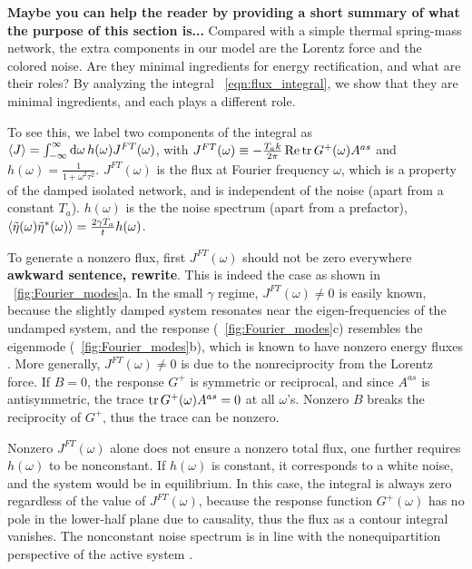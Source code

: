 \documentclass[
 preprint,
 preprintnumbers,
 amsmath,amssymb,
 aps,
 pre,
 longbibliography,
 10pt, twocolumn
]{revtex4-1}
\begin{document}
{\bf Maybe you can help the reader by providing a short summary of what the purpose of this section is... }
Compared with a simple thermal spring-mass network, the extra components in our model are the Lorentz force and the colored noise. Are they minimal ingredients for energy rectification, and what are their roles? 
By analyzing the integral \eqnname~\eqref{eqn:flux_integral}, we show that they are minimal ingredients, and each plays a different role.

To see this, we label two components of the integral as $\expval{J} = \int_{-\infty}^\infty \dd{\omega} h(\omega) J^{FT}(\omega)$, with $J^{FT}(\omega) \equiv -\frac{T_a k}{2\pi} \Re \tr G^+(\omega)A^{as}$ and $h(\omega)=\frac{1}{1+\omega^2\tau^2}$. 
$J^{FT}(\omega)$ is the flux at Fourier frequency $\omega$, which is a property of the damped isolated network, and is independent of the noise (apart from a constant $T_a$). 
$h(\omega)$ is the the noise spectrum (apart from a prefactor), $\expval{\tilde{\eta}(\omega)\tilde{\eta}^*(\omega)} = \frac{2\gamma T_a}{t}h(\omega)$. 

To generate a nonzero flux, first $J^{FT}(\omega)$ should not be zero everywhere {\bf awkward sentence, rewrite}. 
This is indeed the case as shown in \figurename~\ref{fig:Fourier_modes}a. 
In the small $\gamma$ regime, $J^{FT}(\omega) \neq 0$ is easily known, because the slightly damped system resonates near the eigen-frequencies of the undamped system, and the response (\figurename~\ref{fig:Fourier_modes}c) resembles the eigenmode (\figurename~\ref{fig:Fourier_modes}b), which is known to have nonzero energy fluxes \cite{Nash2015TopologicalMetamaterials}. 
More generally, $J^{FT}(\omega) \neq 0$ is due to the nonreciprocity from the Lorentz force. If $B=0$, the response $G^+$ is symmetric or reciprocal, and since $A^{as}$ is antisymmetric, the trace $\tr G^+(\omega) A^{as}=0$ at all $\omega$'s. Nonzero $B$ breaks the reciprocity of $G^+$, thus the trace can be nonzero.

Nonzero $J^{FT}(\omega)$ alone does not ensure a nonzero total flux, one further requires $h(\omega)$ to be nonconstant.
If $h(\omega)$ is constant, it corresponds to a white noise, and the system would be in equilibrium. In this case, the integral is always zero regardless of the value of $J^{FT}(\omega)$, because the response function $G^+(\omega)$ has no pole in the lower-half plane due to causality, thus the flux as a contour integral vanishes.
The nonconstant noise spectrum is in line with the nonequipartition perspective of the active system \cite{Lee2017FluctuationSystems.}.
\end{document}
